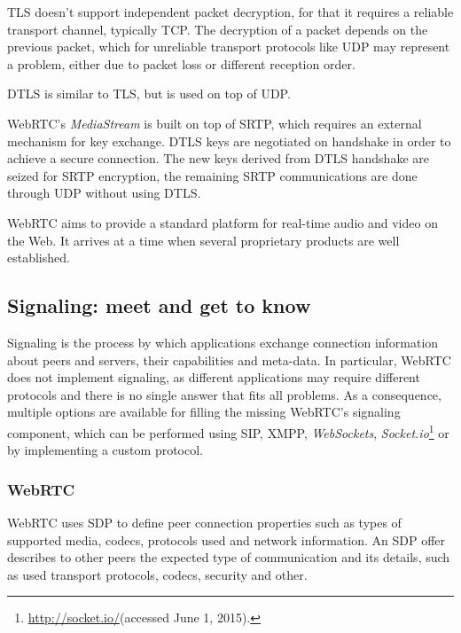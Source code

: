 \documentclass[conference,compsoc,a4paper]{IEEEtran}
\begin{document}
\gls{TLS} doesn't support independent packet decryption\cite{rfc6347}, for that it requires a reliable transport channel, typically \gls{TCP}. The decryption of a packet depends on the previous packet, which for unreliable transport protocols like \gls{UDP} may represent a problem, either due to packet loss or different reception order.

\gls{DTLS} is similar to \gls{TLS}, but is used on top of \gls{UDP}.

\gls{WebRTC}'s \emph{MediaStream} is built on top of \gls{SRTP}, which requires an external mechanism for key exchange. \gls{DTLS} keys are negotiated on handshake in order to achieve a secure connection. The new keys derived from \gls{DTLS} handshake are seized for \gls{SRTP} encryption, the remaining \gls{SRTP} communications are done through \gls{UDP} without using \gls{DTLS}.

\gls{WebRTC} aims to provide a standard platform for real-time audio and video on the Web. It arrives at a time when several proprietary products are well established.

\subsection{Signaling: meet and get to know}
\label{signaling}

  Signaling is the process by which applications exchange connection information about peers and servers, their capabilities and meta-data.
  In particular, \gls{WebRTC} does not implement signaling, as different applications may require different protocols and there is no single answer that fits all problems.
  As a consequence, multiple options are available for filling the missing \gls{WebRTC}'s signaling component, which can be performed using \gls{SIP}, \gls{XMPP}, \emph{WebSockets}, \emph{Socket.io}\footnote{\url{http://socket.io/}(accessed June 1, 2015).} or by implementing a custom protocol.

  \subsubsection{WebRTC}

  \gls{WebRTC} uses \gls{SDP} \cite{rfc4566} to define peer connection properties such as types of supported media, codecs, protocols used and network information. An \gls{SDP} offer describes to other peers the expected type of communication and its details, such as used transport protocols, codecs, security and other.
\end{document}
